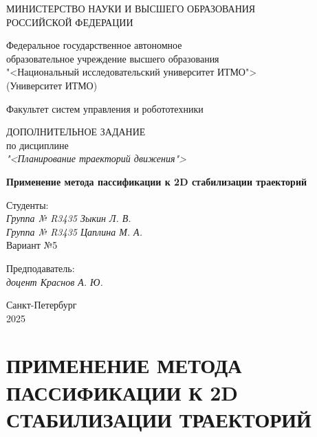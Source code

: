 \documentclass[a4paper,14pt,oneside,openany]{memoir}
\begin{document}
\thispagestyle{empty}

\begin{center}
    МИНИСТЕРСТВО НАУКИ И ВЫСШЕГО ОБРАЗОВАНИЯ \\ РОССИЙСКОЙ ФЕДЕРАЦИИ

    \vspace{20pt}

    Федеральное государственное автономное \\ образовательное учреждение высшего образования \\
    "<Национальный исследовательский университет ИТМО"> \\
    (Университет ИТМО)

    \vspace{20pt}

    Факультет систем управления и робототехники
\end{center}

\vfill

\begin{center}
    ДОПОЛНИТЕЛЬНОЕ ЗАДАНИЕ\\  
    по дисциплине \\
    \textit{"<Планирование траекторий движения">}

    \vspace{20pt}

    \textbf{Применение метода пассификации к 2D стабилизации траекторий}
    
\end{center}

\vfill

    \noindent Студенты: \\
    \textit{Группа № R3435 \hfill Зыкин Л. В.} \\
    \textit{Группа № R3435 \hfill Цаплина М. А.} \\
    \noindent Вариант №5 \\

    \vspace{20pt}

    \noindent Предподаватель: \\
    \textit{доцент \hfill Краснов А. Ю.}

\vfill

\begin{center}
    Санкт-Петербург \\ 2025
\end{center}

\newpage
\setcounter{page}{2}
\OnehalfSpacing*

\chapter{ПРИМЕНЕНИЕ МЕТОДА ПАССИФИКАЦИИ К 2D СТАБИЛИЗАЦИИ ТРАЕКТОРИЙ}
\end{document}
